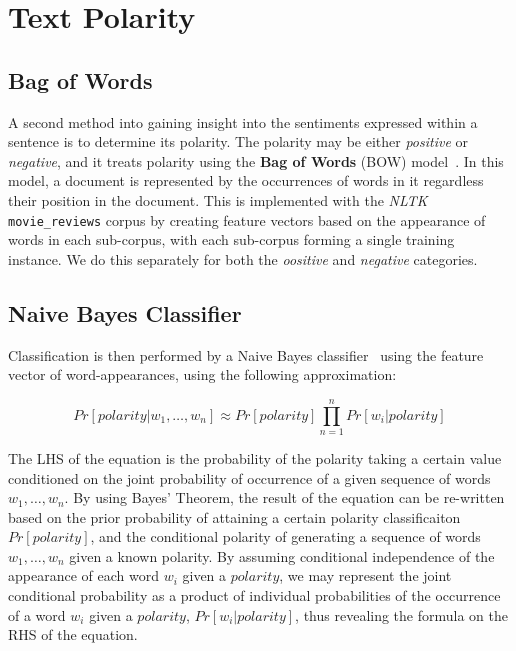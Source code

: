 \documentclass[11pt]{report} %
\begin{document}
\section{Text Polarity}
\label{section:text_polarity}
\subsection{Bag of Words}
A second method into gaining insight into the sentiments expressed within a sentence is to determine its polarity. The polarity may be either \textit{positive} or \textit{negative}, and it treats polarity using the \textbf{Bag of Words} (BOW) model~\cite{harris1954}. In this model, a document is represented by the occurrences of words in it regardless their position in the document. This is implemented with the \textit{NLTK} \verb|movie_reviews| corpus by creating feature vectors based on the appearance of words in each sub-corpus, with each sub-corpus forming a single training instance. We do this separately for both the \textit{oositive} and \textit{negative} categories. 

\subsection{Naive Bayes Classifier}
Classification is then performed by a Naive Bayes classifier~\cite{lewis1998naive, mccallum1998comparison} using the feature vector of word-appearances, using the following approximation:

\begin{equation*} Pr[polarity | w_1, \dots, w_n] 	\approx	 Pr[polarity]  \prod_{n=1}^nPr[w_i|polarity] \end{equation*}

The LHS of the equation is the probability of the polarity taking a certain value conditioned on the joint probability of occurrence of a given sequence of words $w_1, \dots, w_n$. By using Bayes' Theorem, the result of the equation can be re-written based on the prior probability of attaining a certain polarity classificaiton $Pr[polarity]$, and the conditional polarity of generating a sequence of words $w_1, \dots, w_n$ given a known polarity. By assuming conditional independence of the appearance of each word $w_i$ given a $polarity$, we may represent the joint conditional probability as a product of individual probabilities of the occurrence of a word $w_i$ given a $polarity$, $Pr[w_i|polarity]$, thus revealing the formula on the RHS of the equation.
\end{document}
